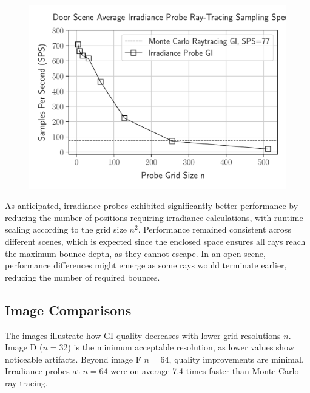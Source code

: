 \documentclass[acmtog, nonacm]{acmart}
\begin{document}
\vspace{-28pt}

\begin{figure}[ht]
  \centering
  \includegraphics[width=0.9\linewidth]{../notebook/plot/door_scene_average_irradiance_probe_ray_tracing_sampling_speed.pdf}
\end{figure}

As anticipated, irradiance probes exhibited significantly better performance by reducing the number of positions requiring irradiance calculations, with runtime scaling according to the grid size \(n^2\). Performance remained consistent across different scenes, which is expected since the enclosed space ensures all rays reach the maximum bounce depth, as they cannot escape. In an open scene, performance differences might emerge as some rays would terminate earlier, reducing the number of required bounces. 

\subsection{Image Comparisons}
The images illustrate how GI quality decreases with lower grid resolutions \( n \). Image D (\( n=32 \)) is the minimum acceptable resolution, as lower values show noticeable artifacts. Beyond image F \( n=64 \), quality improvements are minimal. Irradiance probes at \( n=64 \) were on average 7.4 times faster than Monte Carlo ray tracing.

\vspace{-5pt}
\end{document}
